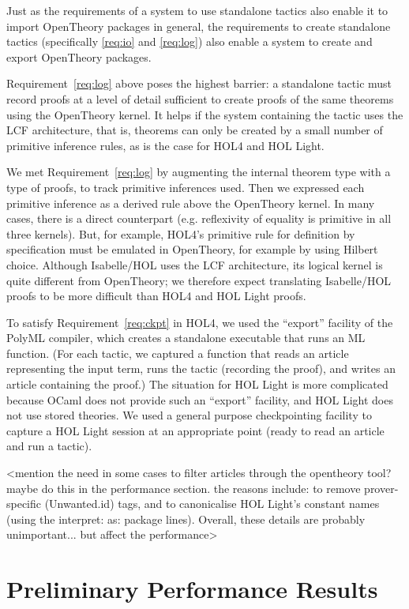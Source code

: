 \documentclass{llncs}
\newcommand{\OpenTheory}{OpenTheory\xspace}
\newcommand{\eg}{e.g.\xspace}
\begin{document}
Just as the requirements of a system to use standalone tactics also enable it to import \OpenTheory packages in general, the requirements to create standalone tactics (specifically \ref{req:io} and \ref{req:log}) also enable a system to create and export \OpenTheory packages.

Requirement~\ref{req:log} above poses the highest barrier: a standalone tactic must record proofs at a level of detail sufficient to create proofs of the same theorems using the \OpenTheory kernel.
It helps if the system containing the tactic uses the LCF architecture, that is, theorems can only be created by a small number of primitive inference rules, as is the case for HOL4 and HOL Light.

We met Requirement~\ref{req:log} by augmenting the internal theorem type with a type of proofs, to track primitive inferences used.
Then we expressed each primitive inference as a derived rule above the \OpenTheory kernel.
In many cases, there is a direct counterpart (\eg reflexivity of equality is primitive in all three kernels).
But, for example, HOL4's primitive rule for definition by specification must be emulated in \OpenTheory, for example by using Hilbert choice.
Although Isabelle/HOL uses the LCF architecture, its logical kernel is quite different from \OpenTheory; we therefore expect translating Isabelle/HOL proofs to be more difficult than HOL4 and HOL Light proofs.

To satisfy Requirement~\ref{req:ckpt} in HOL4, we used the ``export'' facility of the PolyML compiler, which creates a standalone executable that runs an ML function.
(For each tactic, we captured a function that reads an article representing the input term, runs the tactic (recording the proof), and writes an article containing the proof.)
The situation for HOL Light is more complicated because OCaml does not provide such an ``export'' facility, and HOL Light does not use stored theories.
We used a general purpose checkpointing facility to capture a HOL Light session at an appropriate point (ready to read an article and run a tactic).

<mention the need in some cases to filter articles through the opentheory tool? maybe do this in the performance section. the reasons include: to remove prover-specific (Unwanted.id) tags, and to canonicalise HOL Light's constant names (using the interpret: as: package lines). Overall, these details are probably unimportant... but affect the performance>

\section{Preliminary Performance Results}
\label{sec:performance}
\end{document}
